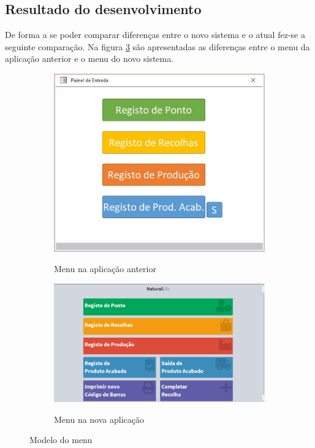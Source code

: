 \subsection{Resultado do desenvolvimento}
De forma a se poder comparar diferenças entre o novo sistema e o atual fez-se a seguinte comparação.
Na figura \ref{fig:comparacao_menu} são apresentadas as diferenças entre o menu da aplicação anterior e o menu do novo sistema.
\begin{figure}[H]
	\centering
	
	\begin{subfigure}[t]{0.45\linewidth}
		\includegraphics[width=\linewidth]{figuras/AppAccess/0-MenuInicial.jpg}
		\label{fig:comparacao_menu_1}
		\caption{Menu na aplicação anterior}
	\end{subfigure}
	\begin{subfigure}[t]{0.45\linewidth}
		\includegraphics[width=\linewidth]{figuras/AppPhp/0-menu_2_fase.png}
		\label{fig:comparacao_menu_2}
		\caption{Menu na nova aplicação}
	\end{subfigure}
	
	\caption{Modelo do menu}
	\label{fig:comparacao_menu}
\end{figure}
